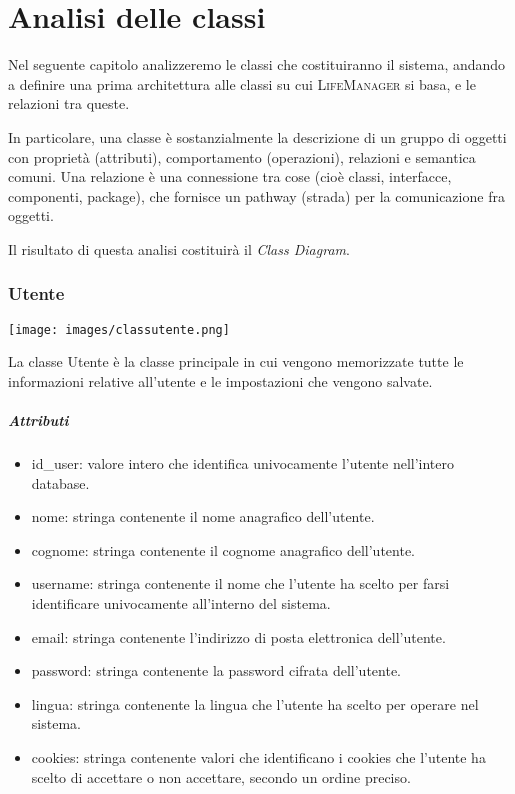 \documentclass[a4paper,12pt]{article}
\begin{document}
\newpage
\part{Analisi delle classi}
Nel seguente capitolo analizzeremo le classi che costituiranno il sistema, andando a definire una prima architettura alle classi su cui {\scshape LifeManager} si basa, e le relazioni tra queste. 

In particolare, una classe è sostanzialmente la descrizione di un gruppo di oggetti con proprietà (attributi), comportamento (operazioni), relazioni e semantica comuni. Una relazione è una connessione tra cose (cioè classi, interfacce, componenti, package), che fornisce un pathway (strada) per la comunicazione fra oggetti.

Il risultato di questa analisi costituirà il \textit{Class Diagram}.


\newpage
\section{Utente}
\begin{center}
  \texttt{[image: images/classutente.png]}
\end{center}
La classe {\sffamily Utente} è la classe principale in cui vengono memorizzate tutte le informazioni relative all'utente e le impostazioni che vengono salvate. 
\subsubsection*{Attributi}
\begin{itemize} \setlength\itemsep{0.01em}
\item {\ttfamily id\_user}: valore intero che identifica univocamente l'utente nell'intero database. 
\item {\ttfamily nome}: stringa contenente il nome anagrafico dell'utente. 
\item {\ttfamily cognome}: stringa contenente il cognome anagrafico dell'utente. 
\item {\ttfamily username}: stringa contenente il nome che l'utente ha scelto per farsi identificare univocamente all'interno del sistema.
\item {\ttfamily email}: stringa contenente l'indirizzo di posta elettronica dell'utente. 
\item {\ttfamily password}: stringa contenente la password cifrata dell'utente.
\item {\ttfamily lingua}: stringa contenente la lingua che l'utente ha scelto per operare nel sistema.
\item {\ttfamily cookies}: stringa contenente valori che identificano i cookies che l'utente ha scelto di accettare o non accettare, secondo un ordine preciso. 
\end{itemize}
\end{document}
